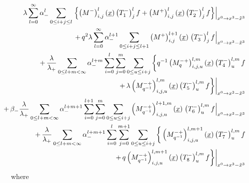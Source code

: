 \documentclass[a4paper,11pt,oneside]{article}
\begin{document}
\begin{eqnarray}
&&\hspace{-2cm}\lambda
\sum_{l=0}^{\infty }\alpha _{-}^{l}\sum_{0\leq i+j\leq l}\left.\left\{ \left(
M^{-}\right) _{i,j}^{l}\left( \underline{x}\right)\left(T^-_1\right)^l_jf 
 +\left( M^{+}\right) _{i,j}^{l}\left( \underline{x}%
\right) \left(T^-_2\right)^l_jf\right\} 
\right| _{x^{0}\rightarrow x^{3}-\tilde{x}^{3}}
\nonumber \\
&&\hspace{-2cm}+\,q^{2}\lambda \sum_{l=0}^{\infty }\alpha
_{-}^{l+1}\sum_{0\leq i+j\leq l+1}\left( M^{+}\right) _{i,j}^{l+1}\left( 
\underline{x}\right) \left.\left(T^-_3\right)^l_jf
\right| _{x^{0}\rightarrow x^{3}-\tilde{x}^{3}} 
\nonumber \\
&&\hspace{-2cm}+\,\frac{\lambda }{\lambda _{+}}\sum_{0\leq l+m<\infty
}\alpha _{-}^{l+m}\sum_{i=0}^{l}\sum_{j=0}^{m}\sum_{0\leq u\leq i+j}\bigg \{ %
q^{-1}\left( M_{q}^{-+}\right) _{i,j,u}^{l,m}\left( \underline{x}\right) 
\left(T^-_4\right)^{l,m}_uf\\ 
&&\hspace{4cm} \left.+\,\lambda \left( M_{q^{-1}}^{-+}\right)
  _{i,j,u}^{l,m}
\left( \underline{x}\right) \left(T^-_5\right)^{l,m}_uf \bigg \}
\right| _{x^{0}\rightarrow x^{3}-\tilde{x}^{3}} 
\nonumber \\
&&\hspace{-2cm}+\,\beta_-\frac{\lambda }{\lambda_+}
\sum_{0\leq l+m<\infty }\alpha
_{-}^{l+m+1}\sum_{i=0}^{l+1}\sum_{j=0}^{m}\sum_{0\leq u\leq i+j}\left(
M_{q^{-1}}^{-+}\right) _{i,j,u}^{l+1,m}\left( \underline{x}\right)
\left. \left(T^-_6\right)^{l,m}_uf
\right| _{x^{0}\rightarrow x^{3}-\tilde{x}%
^{3}}  \nonumber \\
&&\hspace{-2cm}+\,\frac{\lambda }{\lambda _{+}}\sum_{0\leq l+m<\infty
}\alpha _{-}^{l+m+1}\sum_{i=0}^{l}\sum_{j=0}^{m+1}\sum_{0\leq u\leq i+j}%
\bigg \{ \left( M_{q^{-1}}^{-+}\right) _{i,j,u}^{l,m+1}\left( \underline{x}%
\right) \left(T^-_7\right)_u^{l,m}f \nonumber \\
&&\hspace{4cm}\left. +\,q\left( M_{q^{-1}}^{-+}\right)
_{i,j,u}^{l,m+1}\left( \underline{x}\right)\left(T^-_8\right)^{l,m}_uf
\bigg \}
\right| _{x^{0}\rightarrow x^{3}-\tilde{x}^{3}}   \nonumber
\end{eqnarray}
where 
\end{document}
